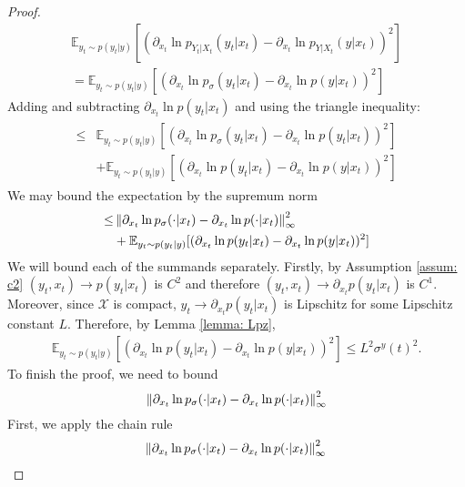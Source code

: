 \begin{proof}
    \begin{align*}
        \mathbb{E}_{y_t \sim p(y_t|y)}[
            (\partial_{x_t} \ln p_{Y_t | X_t}(y_t | x_t)- \partial_{x_t} \ln p_{Y | X_t}(y | x_t) )^2] \\
        = 
        \mathbb{E}_{y_t \sim p(y_t|y)}[
            (\partial_{x_t} \ln p_\sigma(y_t | x_t) - \partial_{x_t}  \ln p(y | x_t) )^2 ]
    \end{align*}
    Adding and subtracting $\partial_{x_t} \ln p(y_t | x_t)$ and using the triangle inequality:
    \begin{align*}
        \! \begin{aligned} 
            \leq &\mathbb{E}_{y_t \sim p(y_t|y)}[
                (\partial_{x_t} \ln p_\sigma(y_t | x_t) - \partial_{x_t} \ln p(y_t | x_t) )^2] \\
            &+ \mathbb{E}_{y_t \sim p(y_t|y)}[
                (\partial_{x_t} \ln p(y_t | x_t)- \partial_{x_t} \ln p(y | x_t) )^2]
        \end{aligned}
    \end{align*}
    We may bound the expectation by the supremum norm
    \begin{align*}
        \! \begin{aligned} 
            \leq & \left\lVert \partial_{x_t} \ln p_\sigma( \cdot | x_t) - \partial_{x_t} \ln p( \cdot | x_t)  \right\rVert_{\infty}^2 \\
            &+ \mathbb{E}_{y_t \sim p(y_t|y)}[(\partial_{x_t} \ln p(y_t | x_t)- \partial_{x_t} \ln p(y | x_t) )^2]
        \end{aligned}
    \end{align*}
    We will bound each of the summands separately. Firstly, by Assumption \ref{assum: c2}  $(y_t, x_t) \to p(y_t | x_t)$ is $C^2$ and therefore $(y_t, x_t) \to \partial_{x_t}p(y_t | x_t)$ is $C^1$. Moreover, since $\mathcal{X}$ is compact,  $y_t \to \partial_{x_t}p(y_t | x_t)$  is Lipschitz for some Lipschitz constant $L$. 
    Therefore, by Lemma \ref{lemma: Lpz},
    \begin{align*}
        \mathbb{E}_{y_t \sim p(y_t|y)}[ (\partial_{x_t} \ln p(y_t | x_t)- \partial_{x_t} \ln p(y | x_t) )^2] \leq  L^2 \sigma^y(t)^2.
    \end{align*} 
    To finish the proof, we need to bound $$ \left\lVert \partial_{x_t} \ln p_\sigma( \cdot | x_t) - \partial_{x_t} \ln p( \cdot | x_t)  \right\rVert_{\infty}^2 $$
    First, we apply the chain rule
    \begin{align*}
        &\phantom{=}\norm{\partial_{x_t} \ln p_\sigma( \cdot | x_t) - \partial_{x_t} \ln p( \cdot | x_t) }_{\infty}^2 

\end{align*}
\end{proof}
